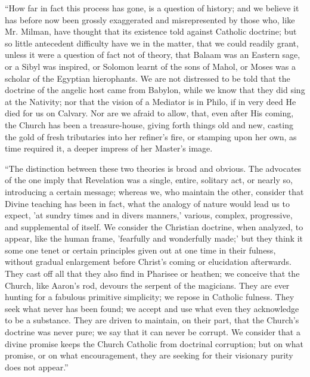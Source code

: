 ``How far in fact this process has gone, is a
question of history; and we believe it has before now
been grossly exaggerated and misrepresented by those who,
like Mr. Milman, have thought that its existence told
against Catholic doctrine; but so little antecedent
difficulty have we in the matter, that we could readily
grant, unless it were a question of fact not of theory,
that Balaam was an Eastern sage, or a Sibyl was inspired,
or Solomon learnt of the sons of Mahol, or Moses was a
scholar of the Egyptian hierophants. We are not
distressed to be told that the doctrine of the angelic
host came from Babylon, while we know that they did sing
at the Nativity; nor that the vision of a Mediator is in
Philo, if in very deed He died for us on Calvary.
Nor are we afraid to allow, that, even after His coming,
the Church has been a treasure-house, giving forth things
old and new, casting the gold of fresh tributaries into
her refiner's fire, or stamping upon her own, as time
required it, a deeper impress of her Master's image.

``The distinction between these two theories is broad
and obvious. The advocates of the one imply that
Revelation was a single, entire, solitary act, or nearly
so, introducing a certain message; whereas we, who
maintain the other, consider that Divine teaching has
been in fact, what the analogy of nature would lead us to
expect, 'at sundry times and in divers manners,' various,
complex, progressive, and supplemental of itself. We
consider the Christian doctrine, when analyzed, to
appear, like the human frame, 'fearfully and wonderfully
made;' but they think it some one tenet or certain
principles given out at one time in their fulness,
without gradual enlargement before Christ's coming or
elucidation afterwards. They cast off all that they also
find in Pharisee or heathen; we conceive that the Church,
like Aaron's rod, devours the serpent of the magicians.
They are ever hunting for a fabulous primitive
simplicity; we repose in Catholic fulness. They seek what
never has been found; we accept and use what even they
acknowledge to be a substance. They are driven to
maintain, on their part, that the Church's doctrine was
never pure; we say that it can never be corrupt. We
consider that a divine promise keeps the Church Catholic
from doctrinal corruption; but on what promise, or on
what encouragement, they are seeking for their visionary
purity does not appear.''



